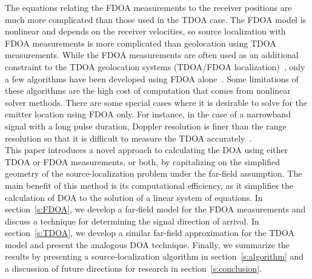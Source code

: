 The equations relating the FDOA measurements to the receiver positions are much more complicated than those used in the TDOA case. The FDOA model is nonlinear and depends on the receiver velocities, so source localization with FDOA measurements is more complicated than geolocation using TDOA measurements. While the FDOA measurements are often used as an additional constraint to the TDOA geolocation systems (TDOA/FDOA localization)~\cite{Ho1997}, only a few algorithms have been developed using FDOA alone~\cite{Cameron,Jinzhou2012}. Some limitations of these algorithms are the high cost of computation that comes from nonlinear solver methods. There are some special cases where it is desirable to solve for the emitter location using FDOA only. For instance, in the case of a narrowband signal with a long pulse duration, Doppler resolution is finer than the range resolution so that it is difficult to measure the TDOA accurately~\cite{Cheney2009,Mason2005,Jinzhou2012}. \\

This paper introduces a novel approach to calculating the DOA using either TDOA or FDOA measurements, or both, by capitalizing on the simplified geometry of the source-localization problem under the far-field assumption. The main benefit of this method is its computational efficiency, as it simplifies the calculation of DOA to the solution of a linear system of equations. In section~\ref{s:FDOA}, we develop a far-field model for the FDOA measurements and discuss a technique for determining the signal direction of arrival. In section~\ref{s:TDOA}, we develop a similar far-field approximation for the TDOA model and present the analogous DOA technique. Finally, we summarize the results by presenting a source-localization algorithm in section~\ref{s:algorithm} and a discussion of future directions for research in section~\ref{s:conclusion}.

